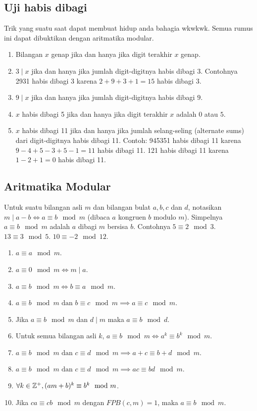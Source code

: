     \subsection{Uji habis dibagi}
    Trik yang suatu saat dapat membuat hidup anda bahagia wkwkwk. Semua rumus ini dapat dibuktikan dengan aritmatika modular.
    \begin{enumerate}
        \item Bilangan $x$ genap jika dan hanya jika digit terakhir $x$ genap.
        \item $3 \mid x$ jika dan hanya jika jumlah digit-digitnya habis dibagi $3$. Contohnya 2931 habis dibagi 3 karena $2+9+3+1=15$ habis dibagi 3.
        \item $9 \mid x$ jika dan hanya jika jumlah digit-digitnya habis dibagi $9$.
        \item $x$ habis dibagi 5 jika dan hanya jika digit terakhir $x$ adalah $0$ atau $5$.
        \item $x$ habis dibagi 11 jika dan hanya jika jumlah selang-seling (alternate sums) dari digit-digitnya habis dibagi 11. Contoh: 945351 habis dibagi 11 karena $9-4+5-3+5-1=11$ habis dibagi 11. 121 habis dibagi 11 karena $1-2+1=0$ habis dibagi 11.
    \end{enumerate}
    
    \subsection{Aritmatika Modular}
    Untuk suatu bilangan asli $m$ dan bilangan bulat $a,b,c$ dan $d$, notasikan $m\mid a-b \iff a \equiv b \mod m$ (dibaca $a$ kongruen $b$ modulo $m$). Simpelnya $a \equiv b \mod m$ adalah $a$ dibagi $m$ bersisa $b$. Contohnya $5 \equiv 2 \mod 3$. $13 \equiv 3 \mod 5$. $10 \equiv -2 \mod 12$.
    \begin{enumerate}
        \item $a \equiv a \mod m$.
        \item $a \equiv 0 \mod m \iff m\mid a$.
        \item $a \equiv b \mod m \iff b \equiv a \mod m$.
        \item $a \equiv b \mod m \text{ dan } b \equiv c \mod m \implies a \equiv c \mod m$.
        \item Jika $a \equiv b \mod m$ dan $d\mid m$ maka $a \equiv b \mod d$.
        \item Untuk semua bilangan asli $k$, $a \equiv b \mod m \iff a^k \equiv b^k \mod m$.
        \item $a \equiv b \mod m \text{ dan } c \equiv d \mod m \implies a+c \equiv b+d \mod m$.
        \item $a \equiv b \mod m \text{ dan } c \equiv d \mod m \implies ac \equiv bd \mod m$.
        \item $\forall k\in \mathbb Z^+, (am+b)^k \equiv b^k \mod m$.
        \item Jika $ca \equiv cb \mod m$ dengan $FPB(c,m)=1$, maka $a \equiv b \mod m$.
    \end{enumerate}
    
